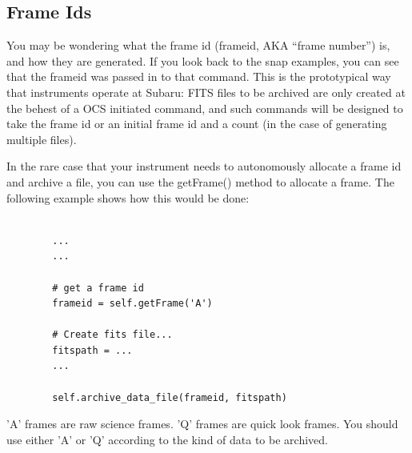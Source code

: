 \documentclass[11pt]{report}
\begin{document}
\subsection{Frame Ids}
You may be wondering what the frame id (frameid, AKA ``frame number'') is,
and how they are generated. If you look back to the snap examples, you
can see that the frameid was passed in to that command. This is the
prototypical way that instruments operate at Subaru: FITS files to be
archived are only created at the behest of a OCS initiated command, and
such commands will be designed to take the frame id or an initial frame
id and a count (in the case of generating multiple files). 

In the rare case that your instrument needs to autonomously allocate a
frame id and archive a file, you can use the getFrame() method to
allocate a frame. The following example shows how this would be done: 
\begin{verbatim}

        ...
        ...

        # get a frame id
        frameid = self.getFrame('A')

        # Create fits file...
        fitspath = ...
        ...

        self.archive_data_file(frameid, fitspath)

\end{verbatim}
'A' frames are raw science frames. 'Q' frames are quick look frames.
You should use either 'A' or 'Q' according to the kind of data
to be archived. 
\end{document}
